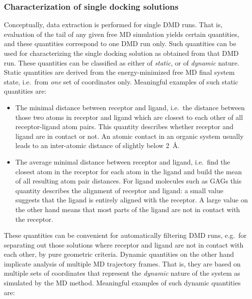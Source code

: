 \subsubsection{Characterization of single docking solutions}

Conceptually, data extraction is performed for single DMD runs. That is,
evaluation of the tail of any given free MD simulation yields certain
quantities, and these quantities correspond to one DMD run only. Such quantities
can be used for characterizing the single docking solution as obtained from that
DMD run. These quantities can be classified as either of \textit{static}, or of
\textit{dynamic} nature. Static quantities are derived from the energy-minimized
free MD final system state, i.e.\ from \textit{one} set of coordinates only.
Meaningful examples of such static quantities are:

\begin{itemize}
\item The minimal distance between receptor and ligand, i.e.\ the distance
between those two atoms in receptor and ligand which are closest to each other
of all receptor-ligand atom pairs. This quantity describes whether receptor and
ligand are in contact or not. An atomic contact in an organic system usually
leads to an inter-atomic distance of slightly below \SI{2}{\angstrom}.
\item The average minimal distance between receptor and ligand, i.e.\ find the
closest atom in the receptor for each atom in the ligand and build the mean of
all resulting atom pair distances. For ligand molecules such as GAGs this
quantity describes the alignment of receptor and ligand: a small value suggests
that the ligand is entirely aligned with the receptor. A large value on the
other hand means that most parts of the ligand are not in contact with the
receptor.
\end{itemize}

These quantities can be convenient for automatically filtering DMD runs, e.g.\
for separating out those solutions where receptor and ligand are not in contact
with each other, by pure geometric criteria. Dynamic quantities on the other
hand implicate analysis of multiple MD trajectory frames. That is, they are
based on multiple sets of coordinates that represent the \textit{dynamic} nature
of the system as simulated by the MD method. Meaningful examples of such dynamic
quantities are:


